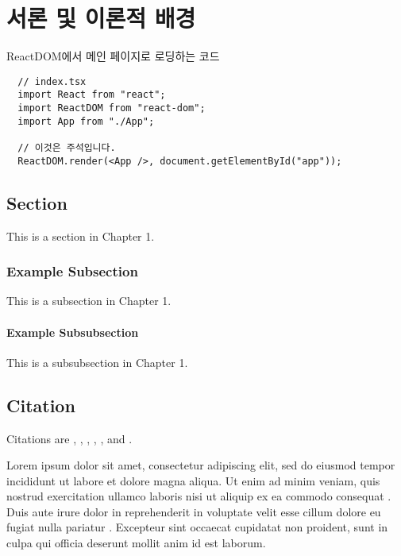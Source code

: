 \chapter{서론 및 이론적 배경}
\label{chap:introduction}

ReactDOM에서 메인 페이지로 로딩하는 코드

\begin{lstlisting}
  // index.tsx
  import React from "react";
  import ReactDOM from "react-dom";
  import App from "./App";
  
  // 이것은 주석입니다.
  ReactDOM.render(<App />, document.getElementById("app"));
\end{lstlisting}

\section{Section}
\label{sec:sec-1-1}

This is a section in Chapter 1.

\subsection{Example Subsection}
\label{subsec:sec-1-1-1}

This is a subsection in Chapter 1.

\subsubsection{Example Subsubsection}

This is a subsubsection in Chapter 1.

\section{Citation}
\label{sec:citation}

Citations are \textcite{ref1}, \textcite{ref2}, \textcite{ref3}, \textcite{ref4}, 
\textcite{einstein}, \textcite{knuth-fa} and \textcite{dirac}.

Lorem ipsum dolor sit amet, consectetur adipiscing elit, sed do eiusmod tempor incididunt ut labore et dolore magna aliqua. Ut enim ad minim veniam, quis nostrud exercitation ullamco laboris nisi ut aliquip ex ea commodo consequat \textcite{ref1}. Duis aute irure dolor in reprehenderit in voluptate velit esse cillum dolore eu fugiat nulla pariatur \textcite{ref2}. Excepteur sint occaecat cupidatat non proident, sunt in culpa qui officia deserunt mollit anim id est laborum.
